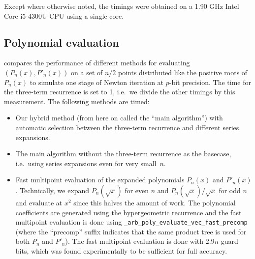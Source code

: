 \documentclass[nohypdvips,review]{siamart0216}
\begin{document}
Except where otherwise noted, the timings were obtained on a
1.90 GHz Intel Core i5-4300U CPU using a single core.

\label{sec:bench}

\subsection{Polynomial evaluation}

 compares the performance of different methods
for evaluating $(P_n(x), P'_n(x))$ on a set of $n/2$ points
distributed like the positive roots of $P_n(x)$
to simulate one stage of Newton iteration at $p$-bit precision.
The time for the three-term recurrence is set to 1, i.e.\ we divide
the other timings by this measurement.
The following methods are timed:

\begin{itemize}
\item Our hybrid method (from here on called the ``main algorithm'')
with automatic selection between the three-term
recurrence and different
series expansions.
\item The main algorithm without
the three-term recurrence as the basecase, i.e.\ using series expansions
even for very small~$n$.
\item Fast multipoint
evaluation of the expanded polynomials $P_n(x)$ and $P'_n(x)$.
Technically, we expand
$P_{n}(\sqrt{x})$ for even $n$ and $P_{n}(\sqrt{x})/\sqrt{x}$ for odd $n$
and evaluate at $x^2$ since this halves the amount of work.
The polynomial coefficients are generated using
the hypergeometric recurrence and
the fast multipoint evaluation is done using
\texttt{\_arb\_poly\_evaluate\_vec\_fast\_precomp}
(where the ``precomp'' suffix indicates that
the same product tree is used for both $P_n$ and $P'_n$).
The fast multipoint evaluation is done with $2.9n$ guard bits,
which was found experimentally to be sufficient for full accuracy.
\end{itemize}
\end{document}
